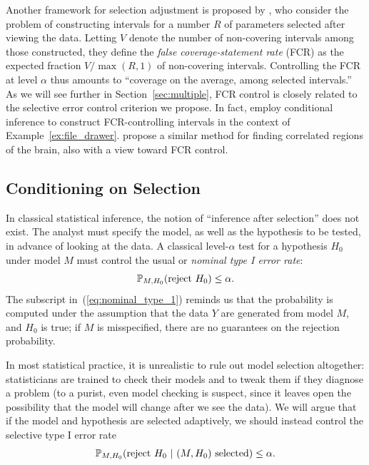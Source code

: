 \documentclass{article}
\theoremstyle{definition}
\begin{document}
Another framework for selection adjustment is proposed by \citet{benjamini2005false}, who consider the problem of constructing intervals for a number $R$ of parameters selected after viewing the data. Letting $V$ denote the number of non-covering intervals among those constructed, they define the {\em false coverage-statement rate} (FCR) as the expected fraction $V/\max(R,1)$ of non-covering intervals. Controlling the FCR at level $\alpha$ thus amounts to ``coverage on the average, among selected intervals.'' As we will see further in Section~\ref{sec:multiple}, FCR control is closely related to the selective error control criterion we propose. In fact, \citet{weinstein2013selection} employ conditional inference to construct FCR-controlling intervals in the context of Example~\ref{ex:file_drawer}. \citet{rosenblatt2014selective} propose a similar method for finding correlated regions of the brain, also with a view toward FCR control.

\subsection{Conditioning on Selection}\label{sec:conditioning}


In classical statistical inference, the notion of ``inference after selection'' does not exist. The analyst must specify the model, as well as the hypothesis to be tested, in advance of looking at the data. A classical level-$\alpha$ test for a hypothesis $H_0$ under model $M$ must control the usual or {\em nominal type I error rate}:
\begin{equation}
\P_{M, H_0}(\text{reject $H_0$}) \leq \alpha.
\label{eq:nominal_type_1}
\end{equation}
The subscript in~(\ref{eq:nominal_type_1}) reminds us that the probability is computed under the assumption that the data $Y$ are generated from model $M$, and $H_0$ is true; if $M$ is misspecified, there are no guarantees on the rejection probability.

In most statistical practice, it is unrealistic to rule out model selection altogether: statisticians are trained to check their models and to tweak them if they diagnose a problem (to a purist, even model checking is suspect, since it leaves open the possibility that the model will change after we see the data). We will argue that if the model and hypothesis are selected adaptively, we should instead control the selective type I error rate
\begin{equation}
\P_{M,H_0}( \text{reject $H_0$}\ |\ \text{$(M, H_0)$ selected} ) \leq \alpha.
\label{eq:selective_type_1}
\end{equation}
\end{document}

